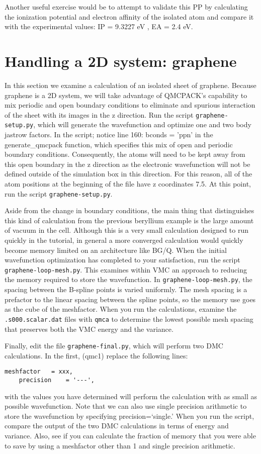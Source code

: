 Another useful exercise would be to attempt to validate this PP by calculating the ionization potential and electron affinity of the isolated atom and compare it with the experimental values:  IP = 9.3227 eV , EA = 2.4 eV.

\section{Handling a 2D system: graphene}
In this section we examine a calculation of an isolated sheet of graphene. Because graphene is a 2D system, we will take advantage of QMCPACK's capability to mix periodic and open boundary conditions to eliminate and spurious interaction of the sheet with its images in the z direction.  Run the script \texttt{graphene-setup.py}, which will generate the wavefunction and optimize one and two body jastrow factors.  In the script; notice line 160: bconds = 'ppn' in the generate\_qmcpack function, which specifies this mix of open and periodic boundary conditions.  Consequently, the atoms will need to be kept away from this open boundary in the z direction as the electronic wavefunction will not be defined outside of the simulation box in this direction.  For this reason, all of the atom positions at the beginning of the file have z coordinates 7.5.  At this point, run the script \texttt{graphene-setup.py}.

Aside from the change in boundary conditions, the main thing that distinguishes this kind of calculation from the previous beryllium example is the large amount of vacuum in the cell.  Although this is a very small calculation designed to run quickly in the tutorial, in general a more converged calculation would quickly become memory limited on an architecture like BG/Q.  When the initial wavefunction optimization has completed to your satisfaction, run the script \texttt{graphene-loop-mesh.py}.  This examines within VMC an approach to reducing the memory required to store the wavefunction.  In \texttt{graphene-loop-mesh.py}, the spacing between the B-spline points is varied uniformly.  The mesh spacing is a prefactor to the linear spacing between the spline points, so the memory use goes as the cube of the meshfactor.  When you run the calculations, examine the \texttt{.s000.scalar.dat} files with \texttt{qmca} to determine the lowest possible mesh spacing that preserves both the VMC energy and the variance.  

Finally, edit the file \texttt{graphene-final.py}, which will perform two DMC calculations.  In the first, (qmc1) replace the following lines:
\begin{lstlisting}[style=Python]
    meshfactor   = xxx,
    precision    = '---',
\end{lstlisting}
with the values you have determined will perform the calculation with as small as possible wavefunction.  Note that we can also use single precision arithmetic to store the wavefunction by specifying precision=`single.'  When you run the script, compare the output of the two DMC calculations in terms of energy and variance.  Also, see if you can calculate the fraction of memory that you were able to save by using a meshfactor other than 1 and single precision arithmetic.


